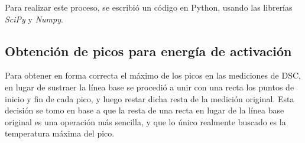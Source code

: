\documentclass[12pt]{article}
\theoremstyle{definition}
\theoremstyle{remark}
\begin{document}
Para realizar este proceso, se escribió un código en Python, usando las librerías \textit{SciPy} y \textit{Numpy}.

\subsection{Obtención de picos para energía de activación}

Para obtener en forma correcta el máximo de los picos en las mediciones de DSC, en lugar de sustraer la línea base se procedió a unir con una recta los puntos de inicio y fin de cada pico, y luego restar dicha resta de la medición original. Esta decisión se tomo en base a que la resta de una recta en lugar de la línea base original es una operación más sencilla, y que lo único realmente buscado es la temperatura máxima del pico.




\nocite{*} 


\end{document}
